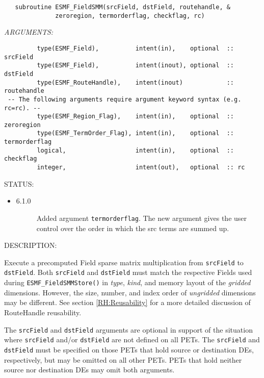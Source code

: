   
\begin{verbatim}   subroutine ESMF_FieldSMM(srcField, dstField, routehandle, &
              zeroregion, termorderflag, checkflag, rc)\end{verbatim}{\em ARGUMENTS:}
\begin{verbatim}         type(ESMF_Field),          intent(in),    optional  :: srcField
         type(ESMF_Field),          intent(inout), optional  :: dstField
         type(ESMF_RouteHandle),    intent(inout)            :: routehandle
 -- The following arguments require argument keyword syntax (e.g. rc=rc). --
         type(ESMF_Region_Flag),    intent(in),    optional  :: zeroregion
         type(ESMF_TermOrder_Flag), intent(in),    optional  :: termorderflag
         logical,                   intent(in),    optional  :: checkflag
         integer,                   intent(out),   optional  :: rc\end{verbatim}
{\sf STATUS:}
   \begin{itemize}
   \item{}
   \begin{description}
   \item[6.1.0] Added argument {\tt termorderflag}.
                The new argument gives the user control over the order in which
                the src terms are summed up.
   \end{description}
   \end{itemize}
  
{\sf DESCRIPTION:\\ }


     \begin{sloppypar}
     Execute a precomputed Field sparse matrix multiplication from {\tt srcField} to
     {\tt dstField}. 
     Both {\tt srcField} and {\tt dstField} must match the respective Fields
     used during {\tt ESMF\_FieldSMMStore()} in {\em type}, {\em kind}, and 
     memory layout of the {\em gridded} dimensions. However, the size, number, 
     and index order of {\em ungridded} dimensions may be different. See section
     \ref{RH:Reusability} for a more detailed discussion of RouteHandle 
     reusability.
     \end{sloppypar}
  
     The {\tt srcField} and {\tt dstField} arguments are optional in support of
     the situation where {\tt srcField} and/or {\tt dstField} are not defined on
     all PETs. The {\tt srcField} and {\tt dstField} must be specified on those
     PETs that hold source or destination DEs, respectively, but may be omitted
     on all other PETs. PETs that hold neither source nor destination DEs may
     omit both arguments.
  
